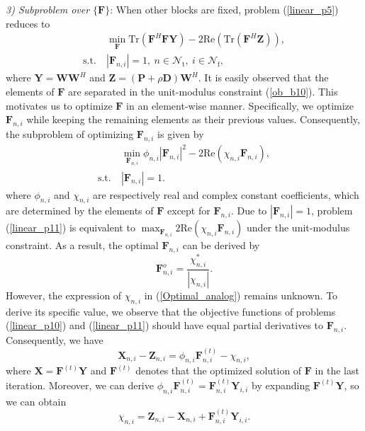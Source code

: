 \documentclass[10pt,journal,twocolumn]{IEEEtran}
\begin{document}
\emph{3) Subproblem over $\big\{\mathbf{F}\big\}$}:  When other blocks are fixed, problem (\ref{linear_p5}) reduces to 
\begin{subequations}\label{linear_p10}
	\begin{align}
&\min_{\mathbf{F} }\text{Tr}\left(\mathbf{F}^H\mathbf{F}\mathbf{Y}\right)-2\text{Re}\left(\text{Tr}\left(\mathbf{F}^H\mathbf{Z}\right)\right),\label{ob_a10}\\
	\text{s.t.}~
 &|\mathbf{F}_{n,i}|=1,~n\in\mathcal{N}_{\text{t}},~i\in\mathcal{N}_{\text{f}},\label{ob_b10}
	\end{align}
\end{subequations}
where $\mathbf{Y}=\mathbf{W}\mathbf{W}^H$ and $\mathbf{Z}=\left(\mathbf{P}+\rho\mathbf{D}\right)\mathbf{W}^H$. It is easily observed that the elements of $\mathbf{F}$ are separated in the unit-modulus constraint (\ref{ob_b10}). This motivates us to optimize $\mathbf{F}$ in an element-wise manner. Specifically, we optimize $\mathbf{F}_{n,i}$ while keeping the remaining elements as their previous values. Consequently, the subproblem of optimizing $\mathbf{F}_{n,i}$ is given by
\begin{subequations}\label{linear_p11}
	\begin{align}
&\min_{\mathbf{F}_{n,i}}\phi_{n,i}|\mathbf{F}_{n,i}|^2-2\text{Re}\left(\chi_{n,i}\mathbf{F}_{n,i}\right),\label{ob_a11}\\
\text{s.t.}~
 &|\mathbf{F}_{n,i}|=1.\label{ob_b11}
\end{align}
\end{subequations}
where $\phi_{n,i}$ and $\chi_{n,i}$ are respectively real and complex constant coefficients, which are determined by the elements of $\mathbf{F}$ except for $\mathbf{F}_{n,i}$. Due to $|\mathbf{F}_{n,i}|=1$, problem (\ref{linear_p11}) is equivalent to $ \max_{\mathbf{F}_{n,i}}2\text{Re}\left(\chi_{n,i}\mathbf{F}_{n,i}\right)$ under the unit-modulus constraint. As a result, the optimal $\mathbf{F}_{n,i}$ can be derived by
\begin{equation}
\mathbf{F}^o_{n,i}=\frac{\chi^*_{n,i}}{|\chi_{n,i}|}.
\label{Optimal_analog}
\end{equation} 
However, the expression of $\chi_{n,i}$ in (\ref{Optimal_analog}) remains unknown. To derive its specific value, we observe that the objective functions of problems (\ref{linear_p10}) and (\ref{linear_p11}) should have equal partial derivatives to $\mathbf{F}_{n,i}$. Consequently, we have 
\begin{equation}
\mathbf{X}_{n,i} -\mathbf{Z}_{n,i} = \phi_{n,i}\mathbf{F}^{(t)}_{n,i}-\chi_{n,i},
\end{equation} 
where $\mathbf{X} = \mathbf{F}^{(t)}\mathbf{Y}$ and $\mathbf{F}^{(t)}$ denotes that the optimized solution of $\mathbf{F}$ in the last iteration. Moreover, we can derive $\phi_{n,i}\mathbf{F}^{(t)}_{n,i}=\mathbf{F}^{(t)}_{n,i}\mathbf{Y}_{i,i}$ by expanding $\mathbf{F}^{(t)}\mathbf{Y}$, so we can obtain
\begin{equation}
\chi_{n,i}=\mathbf{Z}_{n,i}-\mathbf{X}_{n,i} + \mathbf{F}^{(t)}_{n,i}\mathbf{Y}_{i,i}.
\end{equation}
\end{document}
